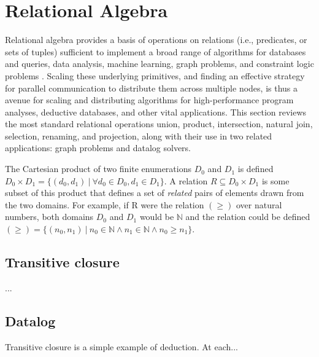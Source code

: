 

\section{Relational Algebra}
\label{sec:ra}
%
Relational algebra provides a basis of operations on relations (i.e., predicates, or sets of tuples) sufficient to implement a broad range of algorithms for databases and queries, data analysis, machine learning, graph problems, and constraint logic problems \cite{}. Scaling these underlying primitives, and finding an effective strategy for parallel communication to distribute them across multiple nodes, is thus a avenue for scaling and distributing algorithms for high-performance program analyses, deductive databases, and other vital applications. This section reviews the most standard relational operations union, product, intersection, natural join, selection, renaming, and projection, along with their use in two related applications: graph problems and datalog solvers.

The Cartesian product of two finite enumerations $D_0$ and $D_1$ is defined $D_0 \times D_1 = \{ (d_0, d_1) \ |\ \forall d_0 \in D_0, d_1 \in D_1 \}$. A relation $R \subseteq D_0 \times D_1$ is some subset of this product that defines a set of \textit{related} pairs of elements drawn from the two domains. For example, if R were the relation $(\geq)$ over natural numbers, both domains $D_0$ and $D_1$ would be $\mathbb{N}$ and the relation could be defined $(\geq) = \{ (n_0, n_1) \ |\ n_0 \in \mathbb{N} \wedge n_1 \in \mathbb{N} \wedge n_0 \geq n_1 \}$.




\subsection{Transitive closure}
\label{sec:ra:tc}
%
...


\subsection{Datalog}
\label{sec:ra:tc}
%
Transitive closure is a simple example of deduction. At each...


